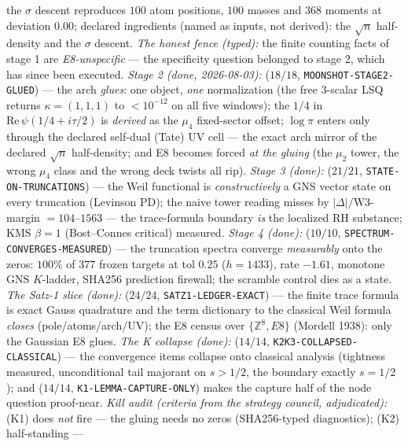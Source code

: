 \documentclass[11pt,a4paper]{article}
\begin{document}
the $\sigma$ descent reproduces $100$ atom positions, $100$ masses
and $368$ moments at deviation $0.00$; declared ingredients (named
as inputs, not derived): the $\sqrt{n}$ half-density and the
$\sigma$ descent.  \emph{The honest fence (typed):} the finite
counting facts of stage 1 are \emph{E8-unspecific} --- the
specificity question belonged to stage 2, which has since been
executed.  \emph{Stage 2 (done, 2026-08-03):}
 ($18/18$,
\texttt{MOONSHOT-STAGE2-GLUED}) --- the arch \emph{glues}: one
object, \emph{one} normalization (the free 3-scalar LSQ returns
$\kappa=(1,1,1)$ to $<10^{-12}$ on all five windows); the $1/4$ in
$\mathrm{Re}\,\psi(1/4+i\tau/2)$ is \emph{derived} as the $\mu_4$
fixed-sector offset; $\log\pi$ enters only through the declared
self-dual (Tate) UV cell --- the exact arch mirror of the declared
$\sqrt{n}$ half-density; and E8 becomes forced \emph{at the gluing}
(the $\mu_2$ tower, the wrong $\mu_4$ class and the wrong deck
twists all rip).  \emph{Stage 3 (done):}
 ($21/21$,
\texttt{STATE-ON-TRUNCATIONS}) --- the Weil functional is
\emph{constructively} a GNS vector state on every truncation
(Levinson PD); the naive tower reading misses by
$|\Delta|/\mathrm{W3}$-margin $=104$--$1563$ --- the trace-formula
boundary \emph{is} the localized RH substance; KMS $\beta=1$
(Bost--Connes critical) measured.  \emph{Stage 4 (done):}
 ($10/10$,
\texttt{SPECTRUM-CONVERGES-MEASURED}) --- the truncation spectra
converge \emph{measurably} onto the zeros: $100\%$ of $377$ frozen
targets at tol $0.25$ ($h=1433$), rate $-1.61$, monotone GNS
$K$-ladder, SHA256 prediction firewall; the scramble control dies
as a state.  \emph{The Satz-1 slice (done):}
 ($24/24$,
\texttt{SATZ1-LEDGER-EXACT}) --- the finite trace formula is exact
Gauss quadrature and the term dictionary to the classical Weil
formula \emph{closes} (pole/atoms/arch/UV); the E8 census over
$\{\mathbb{Z}^8, E8\}$ (Mordell 1938): only the Gaussian E8 glues.
\emph{The K collapse (done):} 
($14/14$, \texttt{K2K3-COLLAPSED-CLASSICAL}) --- the convergence
items collapse onto classical analysis (tightness measured,
unconditional tail majorant on $s>1/2$, the boundary exactly
$s=1/2$); and  ($14/14$,
\texttt{K1-LEMMA-CAPTURE-ONLY}) makes the capture half of the node
question proof-near.  \emph{Kill audit (criteria from the strategy
council, adjudicated):} (K1) does \emph{not} fire --- the gluing
needs no zeros (SHA256-typed diagnostics); (K2) half-standing ---
\end{document}
